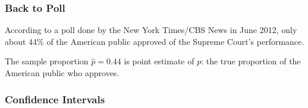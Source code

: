 \documentclass[slides]{beamer}
\newcommand{\blue}[1]{\textcolor{blue2}{#1}}
\newcommand{\phat}{\widehat{p}}
\begin{document}
\begin{frame}[fragile]
\frametitle{Back to Poll}

According to a poll done by the New York Times/CBS News in June 2012, only about 44\% of the American public approved of the Supreme Court's performance.  

\vspace{0.25cm}

The sample proportion $\phat=0.44$ is \blue{point estimate} of $p$: the true proportion of the American public who approves.  

\end{frame}


\begin{frame}[fragile]
\frametitle{Confidence Intervals}

%
%
%
%
%
%
%
%
%
%

\end{frame}
\end{document}
